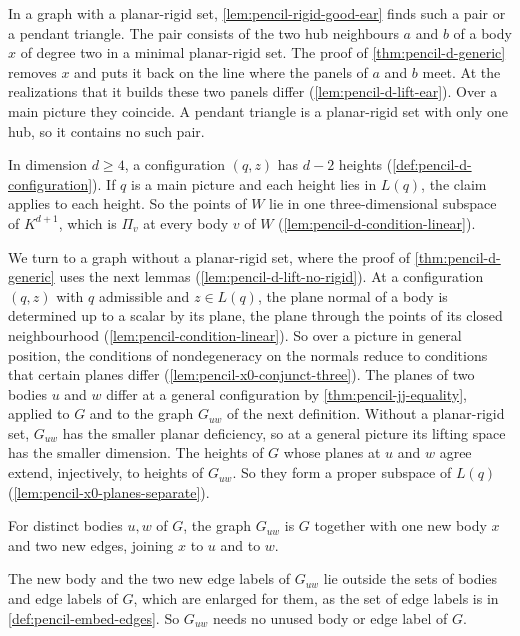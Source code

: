 \begin{remark}
  In a graph with a planar-rigid set, \cref{lem:pencil-rigid-good-ear}
  finds such a pair or a pendant triangle. The pair consists of the two
  hub neighbours $a$ and $b$ of a body $x$ of degree two in a minimal
  planar-rigid set. The proof of \cref{thm:pencil-d-generic} removes $x$
  and puts it back on the line where the panels of $a$ and $b$ meet. At
  the realizations that it builds these two panels differ
  (\cref{lem:pencil-d-lift-ear}). Over a main picture they coincide. A
  pendant triangle is a planar-rigid set with only one hub, so it contains
  no such pair.

  In dimension $d \ge 4$, a configuration $(q, z)$ has $d - 2$ heights
  (\cref{def:pencil-d-configuration}). If $q$ is a main picture and each
  height lies in $L(q)$, the claim applies to each height. So the points
  of $W$ lie in one three-dimensional subspace of $K^{d+1}$, which is
  $\Pi_v$ at every body $v$ of $W$
  (\cref{lem:pencil-d-condition-linear}).
\end{remark}

We turn to a graph without a planar-rigid set, where the proof of
\cref{thm:pencil-d-generic} uses the next lemmas
(\cref{lem:pencil-d-lift-no-rigid}). At a configuration $(q, z)$ with $q$
admissible and $z \in L(q)$, the plane normal of a body is determined up
to a scalar by its plane, the plane through the points of its closed
neighbourhood (\cref{lem:pencil-condition-linear}). So over a picture in
general position, the conditions of nondegeneracy on the normals reduce
to conditions that certain planes differ
(\cref{lem:pencil-x0-conjunct-three}). The planes of two bodies $u$ and
$w$ differ at a general configuration by \cref{thm:pencil-jj-equality},
applied to $G$ and to the graph $G_{uw}$ of the next definition. Without
a planar-rigid set, $G_{uw}$ has the smaller planar deficiency, so at a
general picture its lifting space has the smaller dimension. The heights
of $G$ whose planes at $u$ and $w$ agree extend, injectively, to heights
of $G_{uw}$. So they form a proper subspace of $L(q)$
(\cref{lem:pencil-x0-planes-separate}).

\begin{definition}
  \label{def:pencil-two-ear-graph}
  \leanok
  For distinct bodies $u, w$ of $G$, the graph $G_{uw}$ is $G$ together
  with one new body $x$ and two new edges, joining $x$ to $u$ and to $w$.
\end{definition}
\begin{fmlnote}
  \label{fmlnote:pencil-two-ear-graph}
  The new body and the two new edge labels of $G_{uw}$ lie outside the
  sets of bodies and edge labels of $G$, which are enlarged for them, as
  the set of edge labels is in \cref{def:pencil-embed-edges}. So
  $G_{uw}$ needs no unused body or edge label of $G$.
\end{fmlnote}

